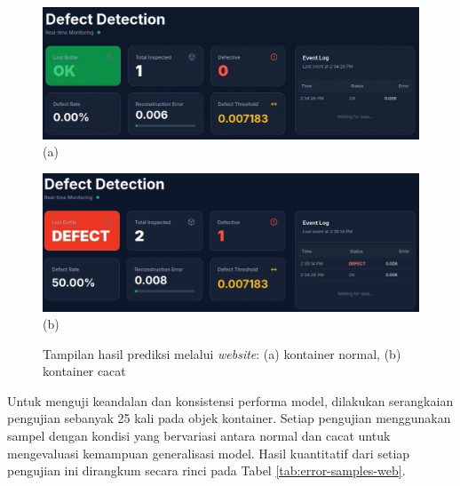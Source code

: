 \begin{figure}[H]
  \centering
  \begin{minipage}{\textwidth}
    \centering
    \includegraphics[width=\textwidth]{gambar/web_ss_normal.png}
    (a)
  \end{minipage}
  \vspace{1em}

  \begin{minipage}{\textwidth}
    \centering
    \includegraphics[width=\textwidth]{gambar/web_ss_cacat.png}
    (b)
  \end{minipage}
  \centering
  \caption{Tampilan hasil prediksi melalui \textit{website}: (a)
  kontainer normal, (b) kontainer cacat}
  \label{fig:web-test}
  \vspace{-1em}
\end{figure}

Untuk menguji keandalan dan konsistensi performa model, dilakukan
serangkaian pengujian sebanyak 25 kali pada objek kontainer. Setiap
pengujian menggunakan sampel dengan kondisi yang bervariasi antara
normal dan cacat untuk mengevaluasi kemampuan generalisasi model.
Hasil kuantitatif dari setiap pengujian ini dirangkum secara rinci
pada Tabel \ref{tab:error-samples-web}.

